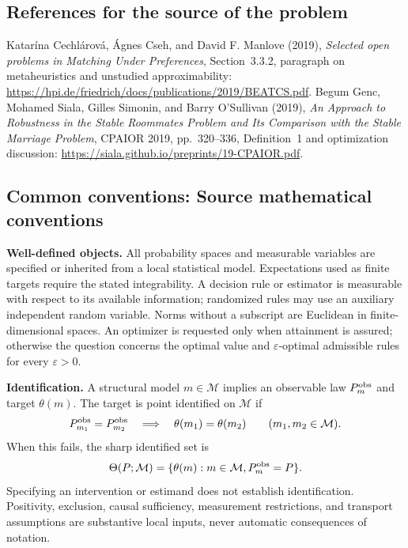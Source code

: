 \documentclass[11pt,a4paper]{article}
\begin{document}
\subsection*{References for the source of the problem}
Katar\'ina Cechl\'arov\'a, \'Agnes Cseh, and David F. Manlove (2019), \emph{Selected open problems in Matching Under Preferences}, Section~3.3.2, paragraph on metaheuristics and unstudied approximability: \url{https://hpi.de/friedrich/docs/publications/2019/BEATCS.pdf}. Begum Genc, Mohamed Siala, Gilles Simonin, and Barry O'Sullivan (2019), \emph{An Approach to Robustness in the Stable Roommates Problem and Its Comparison with the Stable Marriage Problem}, CPAIOR 2019, pp.~320--336, Definition~1 and optimization discussion: \url{https://siala.github.io/preprints/19-CPAIOR.pdf}.

\subsection*{Common conventions: Source mathematical conventions}

\textbf{Well-defined objects.}
All probability spaces and measurable variables are specified or inherited
from a local statistical model. Expectations used as finite targets require
the stated integrability. A decision rule or estimator is measurable with
respect to its available information; randomized rules may use an auxiliary
independent random variable. Norms without a subscript are Euclidean in
finite-dimensional spaces. An optimizer is requested only when attainment
is assured; otherwise the question concerns the optimal value and
$\varepsilon$-optimal admissible rules for every $\varepsilon>0$.

\textbf{Identification.}
A structural model $m\in\mathcal M$ implies an observable law
$P_m^{\rm obs}$ and target $\theta(m)$. The target is point identified on
$\mathcal M$ if
\[
 P_{m_1}^{\rm obs}=P_{m_2}^{\rm obs}
 \quad\Longrightarrow\quad\theta(m_1)=\theta(m_2)
 \qquad(m_1,m_2\in\mathcal M).
\]
When this fails, the sharp identified set is
\[
 \Theta(P;\mathcal M)=\{\theta(m):m\in\mathcal M,
                                  P_m^{\rm obs}=P\}.
\]
Specifying an intervention or estimand does not establish identification.
Positivity, exclusion, causal sufficiency, measurement restrictions, and
transport assumptions are substantive local inputs, never automatic
consequences of notation.
\end{document}
